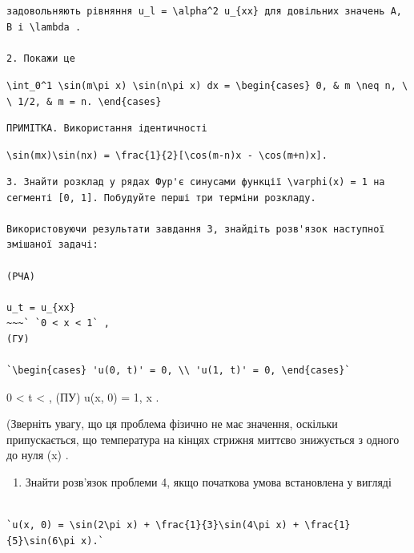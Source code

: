\documentclass[
  ukrainian,
]{article}
\providecommand{\tightlist}{%
  \setlength{\itemsep}{0pt}\setlength{\parskip}{0pt}}
\begin{document}
\begin{verbatim}
задовольняють рівняння u_l = \alpha^2 u_{xx} для довільних значень A, B і \lambda .

2. Покажи це
\end{verbatim}

\texttt{\textbackslash{}int\_0\^{}1\ \textbackslash{}sin(m\textbackslash{}pi\ x)\ \textbackslash{}sin(n\textbackslash{}pi\ x)\ dx\ =\ \textbackslash{}begin\{cases\}\ 0,\ \&\ m\ \textbackslash{}neq\ n,\ \textbackslash{}\textbackslash{}\ 1/2,\ \&\ m\ =\ n.\ \textbackslash{}end\{cases\}}

\begin{verbatim}
ПРИМІТКА. Використання ідентичності
\end{verbatim}

\texttt{\textbackslash{}sin(mx)\textbackslash{}sin(nx)\ =\ \textbackslash{}frac\{1\}\{2\}{[}\textbackslash{}cos(m-n)x\ -\ \textbackslash{}cos(m+n)x{]}.}

\begin{verbatim}
3. Знайти розклад у рядах Фур'є синусами функції \varphi(x) = 1 на сегменті [0, 1]. Побудуйте перші три терміни розкладу.

Використовуючи результати завдання 3, знайдіть розв'язок наступної змішаної задачі:

(PЧА)

u_t = u_{xx}
~~~` `0 < x < 1` , 
(ГУ)

`\begin{cases} 'u(0, t)' = 0, \\ 'u(1, t)' = 0, \end{cases}`
\end{verbatim}

0 \textless{} t \textless{} \infty , (ПУ) u(x, 0) = 1,  \le x
 .

(Зверніть увагу, що ця проблема фізично не має значення, оскільки
припускається, що температура на кінцях стрижня миттєво знижується з
одного до нуля \phi(x) .

\begin{enumerate}
\def\labelenumi{\arabic{enumi}.}
\setcounter{enumi}{4}
\tightlist
\item
  Знайти розв'язок проблеми 4, якщо початкова умова встановлена у
  вигляді
\end{enumerate}

\begin{verbatim}

`u(x, 0) = \sin(2\pi x) + \frac{1}{3}\sin(4\pi x) + \frac{1}{5}\sin(6\pi x).`
\end{verbatim}
\end{document}
